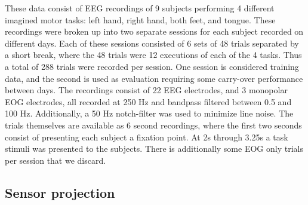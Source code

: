 \documentclass[fleqn,10pt]{wlscirep}
\begin{document}
These data consist of EEG recordings of 9 subjects performing 4 different imagined motor tasks: left hand, right hand, both feet, and tongue. These recordings were broken up into two separate sessions for each subject recorded on different days. Each of these sessions consisted of 6 sets of 48 trials separated by a short break, where the 48 trials were 12 executions of each of the 4 tasks. Thus a total of 288 trials were recorded per session. One session is considered training data, and the second is used as evaluation requiring some carry-over performance between days. The recordings consist of 22 EEG electrodes, and 3 monopolar EOG electrodes, all recorded at 250 Hz and bandpass filtered between 0.5 and 100 Hz. Additionally, a 50 Hz notch-filter was used to minimize line noise. The trials themselves are available as 6 second recordings, where the first two seconds consist of presenting each subject a fixation point. At 2s through 3.25s a task stimuli was presented to the subjects. There is additionally some EOG only trials per session that we discard. 


\subsection*{Sensor projection}\label{sec:sens_proj}
\end{document}
